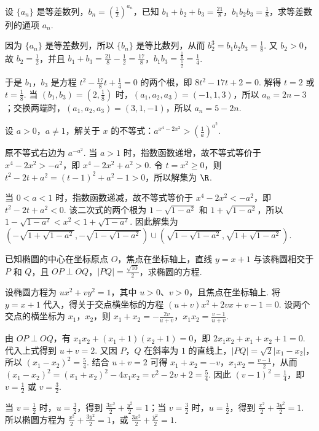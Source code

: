 \begin{problem}
设 \(\{a_{n}\}\) 是等差数列，\(b_{n}=\left(\frac{1}{2}\right)^{a_{n}}\)，已知 \(b_{1}+b_{2}+b_{3}=\frac{21}{8}\)，\(b_{1}b_{2}b_{3}=\frac{1}{8}\)，求等差数列的通项 \(a_{n}\).
\end{problem}

\begin{solution}
因为 \(\{a_n\}\) 是等差数列，所以 \(\{b_n\}\) 是等比数列，从而 \(b_2^3=b_1b_2b_3=\frac18\). 又 \(b_2>0\)，故 \(b_2=\frac12\)，并且 \(b_1+b_3=\frac{21}{8}-\frac12=\frac{17}{8}\)，\(b_1b_3=\frac{\frac{1}{8}}{\frac{1}{2}}=\frac14\).

于是 \(b_1\)，\(b_3\) 是方程 \(t^2-\frac{17}{8}t+\frac14=0\) 的两个根，即 \(8t^2-17t+2=0\). 解得 \(t=2\) 或 \(t=\frac18\). 当 \((b_1,b_3)=(2,\frac18)\) 时，\((a_1,a_2,a_3)=(-1,1,3)\)，所以 \(a_n=2n-3\)；交换两端时，\((a_1,a_2,a_3)=(3,1,-1)\)，所以 \(a_n=5-2n\).
\end{solution}

\begin{problem}
设 \(a > 0\)，\(a \neq 1\)，解关于 \(x\) 的不等式：\(a^{x^{4} - 2x^{2}} > \left(\frac{1}{a}\right)^{a^{2}}\).
\end{problem}

\begin{solution}
原不等式右边为 \(a^{-a^2}\). 当 \(a>1\) 时，指数函数递增，故不等式等价于 \(x^4-2x^2>-a^2\)，即 \(x^4-2x^2+a^2>0\). 令 \(t=x^2\geq0\)，则 \(t^2-2t+a^2=(t-1)^2+a^2-1>0\)，所以解集为 \(\R\).

当 \(0<a<1\) 时，指数函数递减，故不等式等价于 \(x^4-2x^2<-a^2\)，即 \(t^2-2t+a^2<0\). 该二次式的两个根为 \(1-\sqrt{1-a^2}\) 和 \(1+\sqrt{1-a^2}\)，所以 \(1-\sqrt{1-a^2}<x^2<1+\sqrt{1-a^2}\). 因此解集为
\(\left(-\sqrt{1+\sqrt{1-a^2}},-\sqrt{1-\sqrt{1-a^2}}\right)\cup\left(\sqrt{1-\sqrt{1-a^2}},\sqrt{1+\sqrt{1-a^2}}\right)\).
\end{solution}

\begin{problem}
已知椭圆的中心在坐标原点 \(O\)，焦点在坐标轴上，直线 \(y = x + 1\) 与该椭圆相交于 \(P\) 和 \(Q\)，且 \(OP \perp OQ\)，\(|PQ| = \frac{\sqrt{10}}{2}\)，求椭圆的方程.
\end{problem}

\begin{solution}
设椭圆方程为 \(ux^2+vy^2=1\)，其中 \(u>0\)、\(v>0\)，且焦点在坐标轴上. 将 \(y=x+1\) 代入，得关于交点横坐标的方程 \((u+v)x^2+2vx+v-1=0\). 设两个交点的横坐标为 \(x_1\)，\(x_2\)，则
\(x_1+x_2=-\frac{2v}{u+v}\)，\(x_1x_2=\frac{v-1}{u+v}\).

由 \(OP\perp OQ\)，有 \(x_1x_2+(x_1+1)(x_2+1)=0\)，即 \(2x_1x_2+x_1+x_2+1=0\). 代入上式得到 \(u+v=2\). 又因 \(P\)，\(Q\) 在斜率为 \(1\) 的直线上，\(|PQ|=\sqrt2|x_1-x_2|\)，所以 \((x_1-x_2)^2=\frac54\). 结合 \(u+v=2\) 可得 \(x_1+x_2=-v\)，\(x_1x_2=\frac{v-1}{2}\)，从而 \((x_1-x_2)^2=(x_1+x_2)^2-4x_1x_2=v^2-2v+2=\frac54\). 因此 \((v-1)^2=\frac14\)，即 \(v=\frac12\) 或 \(v=\frac32\).

当 \(v=\frac12\) 时，\(u=\frac32\)，得到 \(\frac{3x^2}{2}+\frac{y^2}{2}=1\)；当 \(v=\frac32\) 时，\(u=\frac12\)，得到 \(\frac{x^2}{2}+\frac{3y^2}{2}=1\). 所以椭圆方程为 \(\frac{x^2}{2}+\frac{3y^2}{2}=1\)，或 \(\frac{3x^2}{2}+\frac{y^2}{2}=1\).
\end{solution}
